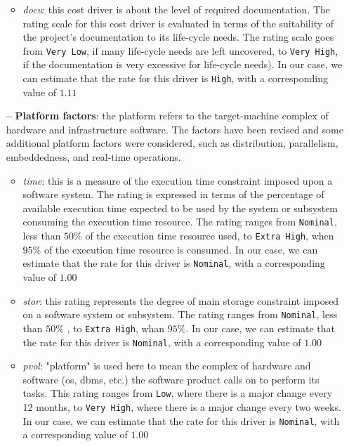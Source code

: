 \begin{itemize}
\begin{itemize}
	\item \textit{\acl{docu}}: this cost driver is about the level of required documentation. The rating scale for this cost driver is evaluated in terms of the suitability of the project's documentation to its life-cycle needs. The rating scale goes from \texttt{Very Low}, if many life-cycle needs are left uncovered, to \texttt{Very High}, if the documentation is very excessive for life-cycle needs). In our case, we can estimate that the rate for this driver is \texttt{High}, with a corresponding value of $1.11$
	
	\end{itemize}
	
\item[\textbf{--}] \textbf{Platform factors}: the platform refers to the target-machine complex of hardware and infrastructure software. The factors have been revised and some additional platform factors were considered, such as distribution, parallelism, embeddedness, and real-time operations.

	\begin{itemize}
	
	\item \textit{\acl{time}}: this is a measure of the execution time constraint imposed upon a software system. The rating is expressed in terms of the percentage of available execution time expected to be used by the system or subsystem consuming the execution time resource. The rating ranges from \texttt{Nominal}, less than $50\%$ of the execution time resource used, to \texttt{Extra High}, when $95\%$ of the execution time resource is consumed. In our case, we can estimate that the rate for this driver is \texttt{Nominal}, with a corresponding value of $1.00$
	
	\item \textit{\acl{stor}}: this rating represents the degree of main storage constraint imposed on a software system or subsystem. The rating ranges from \texttt{Nominal}, less than $50\%$ , to \texttt{Extra High}, whan  $95\%$. In our case, we can estimate that the rate for this driver is \texttt{Nominal}, with a corresponding value of $1.00$
	
	\item \textit{\acl{pvol}}: "platform" is used here to mean the complex of hardware and software (\acs{os}, \acs{dbms}, etc.) the software product calls on to perform its tasks. This rating ranges from \texttt{Low}, where there is a major change every 12 months, to \texttt{Very High}, where there is a major change every two weeks. In our case, we can estimate that the rate for this driver is \texttt{Nominal}, with a corresponding value of $1.00$
	

\end{itemize}
\end{itemize}

